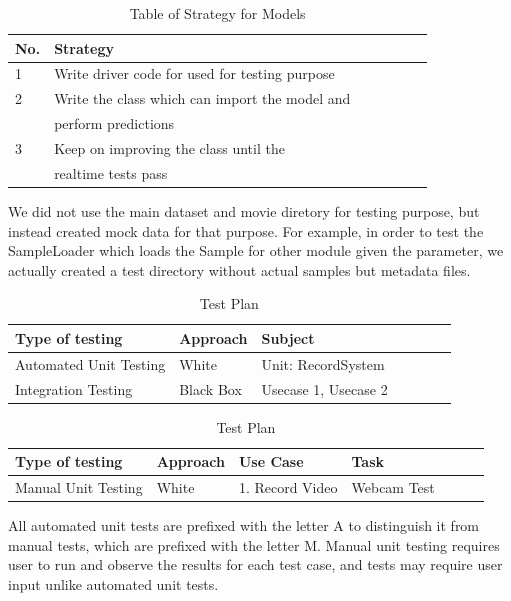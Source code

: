 \documentclass[12pt,a4paper,man]{report}
\begin{document}
\begin{table}[htbp]
\caption{\label{table:mstrattable}
Table of Strategy for Models}
\centering
\begin{tabular}{|l|l|l|l|l|lp{3cm}|}
\hline
\textbf{No.} & \textbf{Strategy}\\
\hline
1 & Write driver code for used for testing purpose\\
\hline
2 & Write the class which can import the model and\\
 & perform predictions\\
\hline
3 & Keep on improving the class until the\\
 & realtime tests pass\\
\hline
\end{tabular}
\end{table}

We did not use the main dataset and movie diretory for testing purpose, but instead created mock data for that purpose. For example, in order to test the SampleLoader which loads the Sample for other module given the parameter, we actually created a test directory without actual samples but metadata files. 

\begin{table}[htbp]
\caption{\label{table:testtable}
Test Plan}
\centering
\begin{tabular}{|l|l|l|l|l|lp{3cm}|}
\hline
\textbf{Type of testing} & \textbf{Approach} & \textbf{Subject}\\
\hline
Automated Unit Testing & White & Unit: RecordSystem\\
Integration Testing & Black Box & Usecase 1, Usecase 2\\
\hline
\end{tabular}
\end{table}


\begin{table}[htbp]
\caption{\label{table:testt}
Test Plan}
\centering
\begin{tabular}{|l|l|l|l|l|lp{3cm}|}
\hline
\textbf{Type of testing} & \textbf{Approach} & \textbf{Use Case} & \textbf{Task}\\
\hline
Manual Unit Testing & White & 1. Record Video & Webcam Test\\
\hline
\end{tabular}
\end{table}



All automated unit tests are prefixed with the letter A to distinguish it from manual tests, which are prefixed with the letter M. Manual unit testing requires user to run and observe the results for each test case, and tests may require user input unlike automated unit tests.
\end{document}
